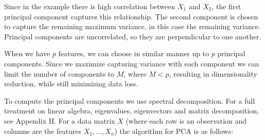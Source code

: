 Since in the example there is high correlation between \(X_1\) and \(X_2\), the first principal component captures this relationship. The second component is chosen to capture the remaining maximum variance, in this case the remaining variance. Principal components are uncorrelated, so they are perpendicular to one another.

When we have \(p\) features, we can choose in similar manner up to \(p\) principal components. Since we maximize capturing variance with each component we can limit the number of components to \(M\), where \(M < p\), resulting in dimensionality reduction, while still minimizing data loss.

To compute the principal components we use spectral decomposition. For a full treatment on linear algebra, eigenvalues, eigenvectors and matrix decomposition, see Appendix II. For a data matrix \(X\) (where each row is an observation and columns are the features \(X_1, ..., X_n\)) the algorithm for PCA is as follows:

